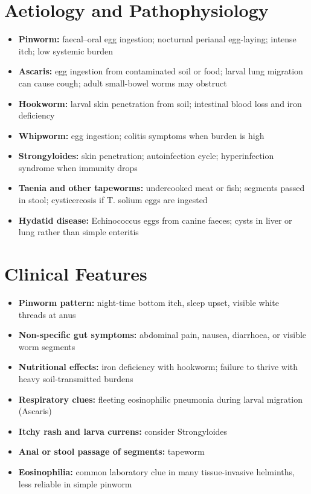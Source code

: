 \section*{Aetiology and Pathophysiology}
\begin{itemize}
    \item \textbf{Pinworm:} faecal--oral egg ingestion; nocturnal perianal egg-laying; intense itch; low systemic burden
    \item \textbf{Ascaris:} egg ingestion from contaminated soil or food; larval lung migration can cause cough; adult small-bowel worms may obstruct
    \item \textbf{Hookworm:} larval skin penetration from soil; intestinal blood loss and iron deficiency
    \item \textbf{Whipworm:} egg ingestion; colitis symptoms when burden is high
    \item \textbf{Strongyloides:} skin penetration; autoinfection cycle; hyperinfection syndrome when immunity drops
    \item \textbf{Taenia and other tapeworms:} undercooked meat or fish; segments passed in stool; cysticercosis if T. solium eggs are ingested
    \item \textbf{Hydatid disease:} Echinococcus eggs from canine faeces; cysts in liver or lung rather than simple enteritis
\end{itemize}

\section*{Clinical Features}
\begin{itemize}
    \item \textbf{Pinworm pattern:} night-time bottom itch, sleep upset, visible white threads at anus
    \item \textbf{Non-specific gut symptoms:} abdominal pain, nausea, diarrhoea, or visible worm segments
    \item \textbf{Nutritional effects:} iron deficiency with hookworm; failure to thrive with heavy soil-transmitted burdens
    \item \textbf{Respiratory clues:} fleeting eosinophilic pneumonia during larval migration (Ascaris)
    \item \textbf{Itchy rash and larva currens:} consider Strongyloides
    \item \textbf{Anal or stool passage of segments:} tapeworm
    \item \textbf{Eosinophilia:} common laboratory clue in many tissue-invasive helminths, less reliable in simple pinworm
\end{itemize}

